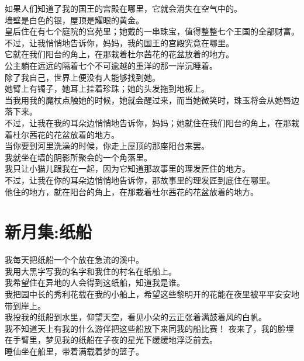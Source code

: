 \documentclass[]{book}
\renewenvironment{quote}{\begin{VF}}{\end{VF}}
\begin{document}
\begin{quote}
如果人们知道了我的国王的宫殿在哪里，它就会消失在空气中的。\\
墙壁是白色的银，屋顶是耀眼的黄金。\\
皇后住在有七个庭院的宫苑里；她戴的一串珠宝，值得整整七个王国的全部财富。\\
不过，让我悄悄地告诉你，妈妈，我的国王的宫殿究竟在哪里。\\
它就在我们阳台的角上，在那栽着杜尔茜花的花盆放着的地方。\\
公主躺在远远的隔着七个不可逾越的重洋的那一岸沉睡着。\\
除了我自己，世界上便没有人能够找到她。\\
她臂上有镯子，她耳上挂着珍珠；她的头发拖到地板上。\\
当我用我的魔杖点触她的时候，她就会醒过来，而当她微笑时，珠玉将会从她唇边落下来。\\
不过，让我在我的耳朵边悄悄地告诉你，妈妈；她就住在我们阳台的角上，在那栽着杜尔茜花的花盆放着的地方。\\
当你要到河里洗澡的时候，你走上屋顶的那座阳台来罢。\\
我就坐在墙的阴影所聚会的一个角落里。\\
我只让小猫儿跟我在一起，因为它知道那故事里的理发匠住的地方。\\
不过，让我在你的耳朵边悄悄地告诉你，那故事里的理发匠到底住在哪里。\\
他住的地方，就在阳台的角上，在那栽着杜尔茜花的花盆放着的地方。
\end{quote}

\section{新月集:纸船}

\begin{quote}
我每天把纸船一个个放在急流的溪中。\\
我用大黑字写我的名字和我住的村名在纸船上。\\
我希望住在异地的人会得到这纸船，知道我是谁。\\
我把园中长的秀利花载在我的小船上，希望这些黎明开的花能在夜里被平平安安地带到岸上。\\
我投我的纸船到水里，仰望天空，看见小朵的云正张着满鼓着风的白帆。\\
我不知道天上有我的什么游伴把这些船放下来同我的船比赛！
夜来了，我的脸埋在手臂里，梦见我的纸船在子夜的星光下缓缓地浮泛前去。\\
睡仙坐在船里，带着满载着梦的篮子。
\end{quote}
\end{document}
